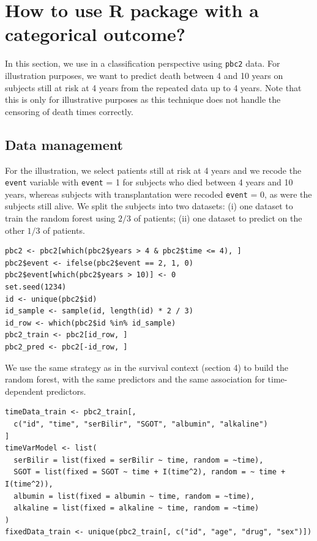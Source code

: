 \section{\texorpdfstring{How to use  R package with a categorical outcome?}{How to use  R package with a categorical outcome?}}\label{how-to-use-r-package-with-a-categorical-outcome}

In this section, we use  in a classification perspective using \texttt{pbc2} data. For illustration purposes, we want to predict death between 4 and 10 years on subjects still at risk at 4 years from the repeated data up to 4 years. Note that this is only for illustrative purposes as this technique does not handle the censoring of death times correctly.

\subsection{Data management}\label{data-management-1}

For the illustration, we select patients still at risk at 4 years and we recode the \texttt{event} variable with \texttt{event} = 1 for subjects who died between 4 years and 10 years, whereas subjects with transplantation were recoded \texttt{event} = 0, as were the subjects still alive. We split the subjects into two datasets: (i) one dataset to train the random forest using \(2/3\) of patients; (ii) one dataset to predict on the other \(1/3\) of patients.

\begin{verbatim}
pbc2 <- pbc2[which(pbc2$years > 4 & pbc2$time <= 4), ]
pbc2$event <- ifelse(pbc2$event == 2, 1, 0)
pbc2$event[which(pbc2$years > 10)] <- 0
set.seed(1234)
id <- unique(pbc2$id)
id_sample <- sample(id, length(id) * 2 / 3)
id_row <- which(pbc2$id %in% id_sample)
pbc2_train <- pbc2[id_row, ]
pbc2_pred <- pbc2[-id_row, ]
\end{verbatim}

We use the same strategy as in the survival context (section 4) to build the random forest, with the same predictors and the same association for time-dependent predictors.

\begin{verbatim}
timeData_train <- pbc2_train[,
  c("id", "time", "serBilir", "SGOT", "albumin", "alkaline")
]
timeVarModel <- list(
  serBilir = list(fixed = serBilir ~ time, random = ~time),
  SGOT = list(fixed = SGOT ~ time + I(time^2), random = ~ time + I(time^2)),
  albumin = list(fixed = albumin ~ time, random = ~time),
  alkaline = list(fixed = alkaline ~ time, random = ~time)
)
fixedData_train <- unique(pbc2_train[, c("id", "age", "drug", "sex")])
\end{verbatim}

